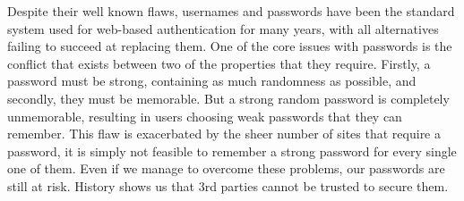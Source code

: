 Despite their well known flaws, usernames and passwords have been the standard system used for web-based authentication for many years, with all alternatives failing to succeed at replacing them. One of the core issues with passwords is the conflict that exists between two of the properties that they require. Firstly, a password must be strong, containing as much randomness as possible, and secondly, they must be memorable. But a strong random password is completely unmemorable, resulting in users choosing weak passwords that they can remember. This flaw is exacerbated by the sheer number of sites that require a password, it is simply not feasible to remember a strong password for every single one of them. Even if we manage to overcome these problems, our passwords are still at risk. History shows us that 3rd parties cannot be trusted to secure them.
